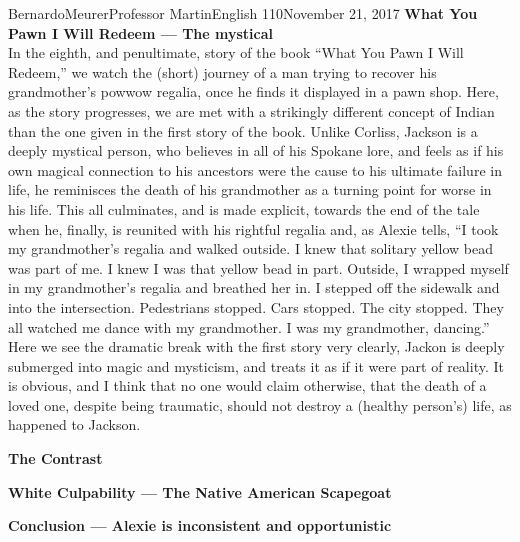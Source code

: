 \documentclass[12pt,letterpaper]{article}
\begin{document}
\begin{mla}{Bernardo}{Meurer}{Professor Martin}{English 110}{November 21, 2017}
        \noindent\textbf{What You Pawn I Will Redeem --- The mystical}\\
        In the eighth, and penultimate, story of the book ``What You Pawn I Will Redeem,'' we watch the (short) journey of a man trying to recover his grandmother's powwow regalia, once he finds it displayed in a pawn shop. Here, as the story progresses, we are met with a strikingly different concept of Indian than the one given in the first story of the book. Unlike Corliss, Jackson is a deeply mystical person, who believes in all of his Spokane lore, and feels as if his own magical connection to his ancestors were the cause to his ultimate failure in life, he reminisces the death of his grandmother as a turning point for worse in his life. This all culminates, and is made explicit, towards the end of the tale when he, finally, is reunited with his rightful regalia and, as Alexie tells, ``I took my grandmother’s regalia and walked outside. I knew that solitary yellow bead was part of me. I knew I was that yellow bead in part. Outside, I wrapped myself in my grandmother’s regalia and breathed her in. I stepped off the sidewalk and into the intersection. Pedestrians stopped. Cars stopped. The city stopped. They all watched me dance with my grandmother. I was my grandmother, dancing.'' Here we see the dramatic break with the first story very clearly, Jackon is deeply submerged into magic and mysticism, and treats it as if it were part of reality. It is obvious, and I think that no one would claim otherwise, that the death of a loved one, despite being traumatic, should not destroy a (healthy person's) life, as happened to Jackson.

        \noindent\textbf{The Contrast}

        \noindent\textbf{White Culpability --- The Native American Scapegoat}

        \noindent\textbf{Conclusion --- Alexie is inconsistent and opportunistic}
    \end{mla}
    
\end{document}
